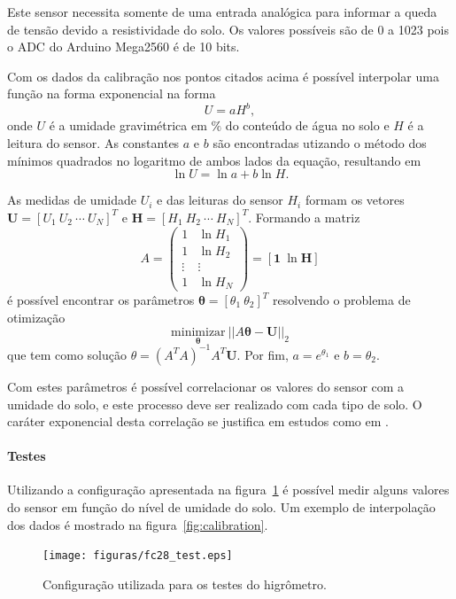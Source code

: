 			Este sensor necessita somente de uma entrada analógica para informar
			a queda de tensão devido a resistividade do solo. Os valores possíveis
			são de 0 a 1023 pois o ADC do Arduino Mega2560 é de 10 bits.

			Com os dados da calibração nos pontos citados acima é possível
			interpolar uma função na forma exponencial na forma
			\[
				U = a H^b,
			\]
			onde $U$ é a umidade gravimétrica em $\%$ do conteúdo de água
			no solo e $H$ é a leitura do sensor. As constantes $a$ e $b$
			são encontradas utizando o método dos mínimos quadrados
			no logaritmo de ambos lados da equação, resultando em
			\[
				\ln U = \ln a + b \ln H.
			\]

			As medidas de umidade $U_i$ e das leituras do sensor $H_i$
			formam os vetores $\mathbf{U} = [U_1~U_2~\cdots~U_N]^T$ e
			$\mathbf{H} = [H_1~H_2~\cdots~H_N]^T$. Formando a matriz
			\[
				A =
				\begin{pmatrix}
					1 & \ln H_1 \\
					1 & \ln H_2 \\
					\vdots & \vdots \\
					1 & \ln H_N
				\end{pmatrix} = [ \mathbf{1}~\ln \mathbf{H} ]
			\]
			é possível encontrar os parâmetros $\mathbf{\theta} = [\theta_1~\theta_2]^T$
			resolvendo o problema de otimização
			\[
				\underset{\mathbf{\theta}}{\textrm{minimizar}}~|| A\mathbf{\theta} - \mathbf{U} ||_2
			\]
			que tem como solução $\theta = (A^TA)^{-1}A^T\mathbf{U}$.
			Por fim, $a = e^{\theta_1}$ e $b = \theta_2$.

			Com estes parâmetros é possível correlacionar os valores do
			sensor com a umidade do solo, e este processo deve ser realizado
			com cada tipo de solo.
			O caráter exponencial desta correlação se justifica em estudos
			como em .

		\newpage
		\paragraph{Testes}

			Utilizando a configuração apresentada na figura~\ref{fig:fc28test} é
			possível medir alguns valores do sensor em função do nível de
			umidade do solo. Um exemplo de interpolação dos dados é mostrado
			na figura~\ref{fig:calibration}.

			\begin{figure}[!htbp]
			\begin{center}
			\texttt{[image: figuras/fc28\_test.eps]}
			\caption{\label{fig:fc28test}Configuração utilizada para os testes do higrômetro.}
			\end{center}
			\end{figure}

